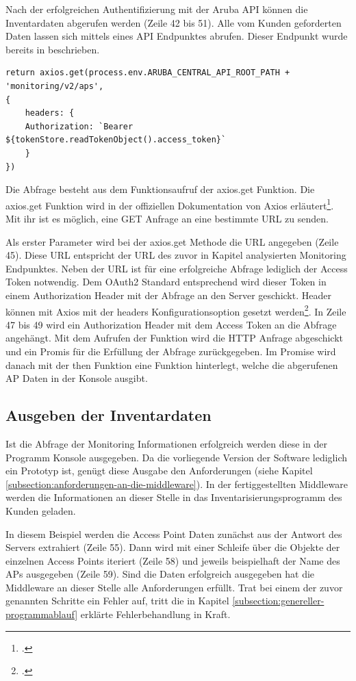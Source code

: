 Nach der erfolgreichen Authentifizierung mit der Aruba API können die Inventardaten abgerufen werden (Zeile 42 bis 51). Alle vom Kunden geforderten Daten lassen sich mittels eines API Endpunktes abrufen. Dieser Endpunkt wurde bereits in beschrieben. 

\lstset{firstnumber=13}
\begin{lstlisting}
return axios.get(process.env.ARUBA_CENTRAL_API_ROOT_PATH + 'monitoring/v2/aps',
{
    headers: {
    Authorization: `Bearer ${tokenStore.readTokenObject().access_token}`
    }
})    
\end{lstlisting}

Die Abfrage besteht aus dem Funktionsaufruf der axios.get Funktion. Die axios.get Funktion wird in der offiziellen Dokumentation von Axios erläutert\footcite{zabriskie_axios_2021-1}. Mit ihr ist es möglich, eine GET Anfrage an eine bestimmte URL zu senden. 

Als erster Parameter wird bei der axios.get Methode die URL angegeben (Zeile 45). Diese URL entspricht der URL des zuvor in Kapitel analysierten Monitoring Endpunktes. Neben der URL ist für eine erfolgreiche Abfrage lediglich der Access Token notwendig. Dem OAuth2 Standard entsprechend wird dieser Token in einem Authorization Header mit der Abfrage an den Server geschickt. Header können mit Axios mit der headers Konfigurationsoption gesetzt werden\footcite{zabriskie_axios_2021}. In Zeile 47 bis 49 wird ein Authorization Header mit dem Access Token an die Abfrage angehängt. Mit dem Aufrufen der Funktion wird die HTTP Anfrage abgeschickt und ein Promis für die Erfüllung der Abfrage zurückgegeben. Im Promise wird danach mit der then Funktion eine Funktion hinterlegt, welche die abgerufenen AP Daten in der Konsole ausgibt.

\subsection{Ausgeben der Inventardaten}\label{subsection:ausgeben-der-Inventardaten}

Ist die Abfrage der Monitoring Informationen erfolgreich werden diese in der Programm Konsole ausgegeben. Da die vorliegende Version der Software lediglich ein Prototyp ist, genügt diese Ausgabe den Anforderungen (siehe Kapitel \ref{subsection:anforderungen-an-die-middleware}). In der fertiggestellten Middleware werden die Informationen an dieser Stelle in das Inventarisierungsprogramm des Kunden geladen. 

In diesem Beispiel werden die Access Point Daten zunächst aus der Antwort des Servers extrahiert (Zeile 55). Dann wird mit einer Schleife über die Objekte der einzelnen Access Points iteriert (Zeile 58) und jeweils beispielhaft der Name des APs ausgegeben (Zeile 59).
Sind die Daten erfolgreich ausgegeben hat die Middleware an dieser Stelle alle Anforderungen erfüllt. Trat bei einem der zuvor genannten Schritte ein Fehler auf, tritt die in Kapitel \ref{subsection:genereller-programmablauf} erklärte Fehlerbehandlung in Kraft.



